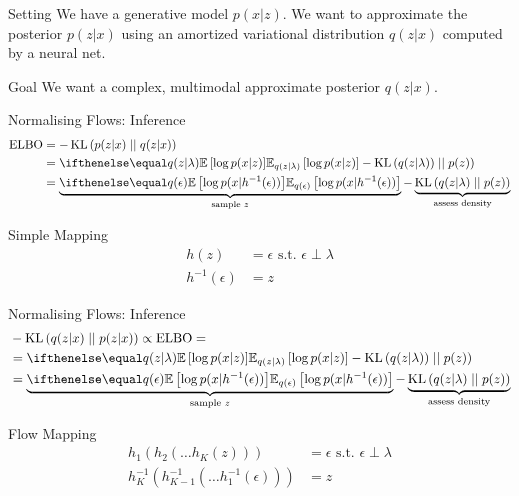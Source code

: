 \documentclass[14pt]{beamer}
\begin{document}
\begin{frame}{Setting}
We have a generative model $ p(x|z) $. We want to approximate the posterior $ p(z|x) $ using an amortized variational distribution $ q(z|x) $ computed by a neural net.
\begin{block}{Goal}
We want a complex, multimodal approximate posterior $ q(z|x) $.
\end{block}
\end{frame}

\begin{frame}{Normalising Flows: Inference}
\begin{equation*}
\begin{aligned}
\ELBO &= -\KL{p(z|x)}{q(z|x)} \\
&= \E[q(z|\lambda)]{\log p(x|z)} - \KL{q(z|\lambda))}{p(z)} \\
&= \underbrace{\E[q(\epsilon)]{\log p(x|h^{-1}(\epsilon))}}_{\text{sample $ z $}} - \underbrace{\KL{q(z|\lambda)}{p(z)}}_{\text{assess density}}
\end{aligned}
\end{equation*}
\begin{block}{Simple Mapping}
\begin{equation*}
\begin{aligned}
h(z) &= \epsilon \text{ s.t. } \epsilon \perp \lambda \\
h^{-1}(\epsilon) &= z
\end{aligned}
\end{equation*}
\end{block}
\end{frame}

\begin{frame}{Normalising Flows: Inference}
\begin{equation*}
\begin{aligned}
&-\KL{q(z|x)}{p(z|x)} \propto \ELBO = \\
&= \E[q(z|\lambda)]{\log p(x|z)} - \KL{q(z|\lambda))}{p(z)} \\
&= \underbrace{\E[q(\epsilon)]{\log p(x|h^{-1}(\epsilon))}}_{\text{sample $ z $}} - \underbrace{\KL{q(z|\lambda)}{p(z)}}_{\text{assess density}}
\end{aligned}
\end{equation*}
\begin{block}{Flow Mapping}
\begin{equation*}
\begin{aligned}
h_{1}(h_{2}(\ldots h_{K}(z))) &= \epsilon \text{ s.t. } \epsilon \perp \lambda \\
h^{-1}_{K}(h^{-1}_{K-1}(\ldots h^{-1}_{1}(\epsilon))) &= z
\end{aligned}
\end{equation*}
\end{block}
\end{frame}
\end{document}
